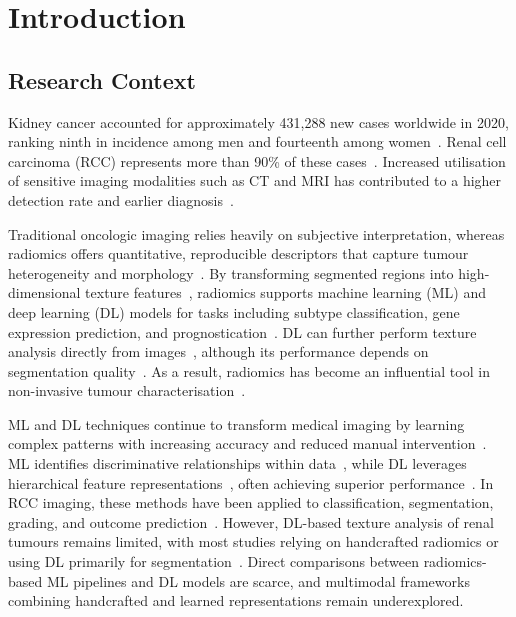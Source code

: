 \documentclass[final,british,a4paper,12pt]{phdthesis}
\begin{document}
\onehalfspacing

\setlength{\parskip}{5pt}

\chapter{Introduction}\label{chap:intro}
    
\section{Research Context}\label{sec:research_context}
Kidney cancer accounted for approximately 431,288 new cases worldwide in 2020, ranking ninth in incidence among men and fourteenth among women~\cite{Statistics_cancer_2020,BUKAVINA2022529_2022_rcc}. Renal cell carcinoma (RCC) represents more than 90\% of these cases~\cite{Renal_cell_2017,RINI20091119_rcc_1,SANCHEZGASTALDO201777_rcc2,rcc_4}. Increased utilisation of sensitive imaging modalities such as CT and MRI has contributed to a higher detection rate and earlier diagnosis~\cite{rcc_CT,ct_2}.

Traditional oncologic imaging relies heavily on subjective interpretation, whereas radiomics offers quantitative, reproducible descriptors that capture tumour heterogeneity and morphology~\cite{radiomicsIntro,radiomics1}. By transforming segmented regions into high-dimensional texture features~\cite{radiomics2,radiomics3}, radiomics supports machine learning (ML) and deep learning (DL) models for tasks including subtype classification, gene expression prediction, and prognostication~\cite{radiomics2,radiomics3,radiomics4,radiomics5}. DL can further perform texture analysis directly from images~\cite{radiomicsDL}, although its performance depends on segmentation quality~\cite{radiomics2,radiomics3}. As a result, radiomics has become an influential tool in non-invasive tumour characterisation~\cite{radiomics4}.

ML and DL techniques continue to transform medical imaging by learning complex patterns with increasing accuracy and reduced manual intervention~\cite{radiomicsDL,DLradiology}. ML identifies discriminative relationships within data~\cite{ML,radiomics4}, while DL leverages hierarchical feature representations~\cite{DL}, often achieving superior performance~\cite{DL,DLradiology,radiomicsDL}. In RCC imaging, these methods have been applied to classification, segmentation, grading, and outcome prediction~\cite{DLradiology,radiomicsDL,radiomics2,radiomics3,radiomics4,radiomics5}. However, DL-based texture analysis of renal tumours remains limited, with most studies relying on handcrafted radiomics or using DL primarily for segmentation~\cite{litjens2017survey}. Direct comparisons between radiomics-based ML pipelines and DL models are scarce, and multimodal frameworks combining handcrafted and learned representations remain underexplored.
\end{document}
